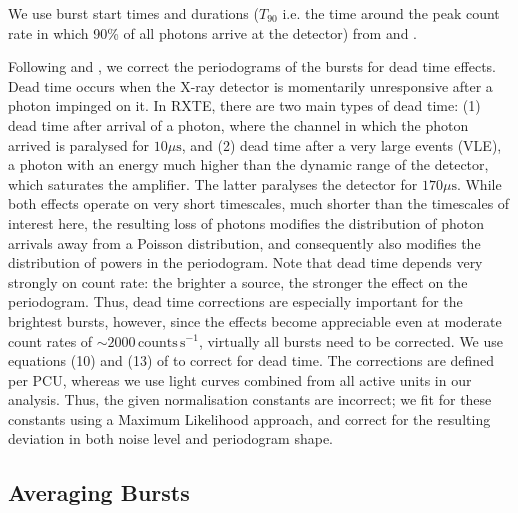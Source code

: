 \documentclass[numberedappendix]{emulateapj}
\begin{document}
We use burst start times and durations ($T_{90}$ i.e. the time around the peak count rate in which 90\% of all photons arrive at the detector) from \citet{gogus1999} and \citet{gogus2000}. 

Following \citet{zhang1995} and \citet{jahoda2006}, we correct the periodograms of the bursts for dead time effects. Dead time occurs when the X-ray detector is momentarily unresponsive after a photon impinged on it. In RXTE, there are two main types of dead time: (1) dead time after arrival of a photon, where the channel in which the photon arrived is paralysed for $10\mu\mathrm{s}$, and (2) dead time after a very large events (VLE), a photon with an energy much higher than the dynamic range of the detector, which saturates the amplifier. The latter paralyses the detector for $170\mu\mathrm{s}$. While both effects operate on very short timescales, much shorter than the timescales of interest here, the resulting loss of photons modifies the distribution of photon arrivals away from a Poisson distribution, and consequently also modifies the distribution of powers in the periodogram. Note that dead time depends very strongly on count rate: the brighter a source, the stronger the effect on the periodogram. Thus, dead time corrections are especially important for the brightest bursts, however, since the effects become appreciable even at moderate count rates of $\sim 2000 \,\mathrm{counts}\,\mathrm{s}^{-1}$, virtually all bursts need to be corrected. We use equations (10) and (13) of \citet{jahoda2006} to correct for dead time. The corrections are defined per PCU, whereas we use light curves combined from all active units in our analysis. Thus, the given normalisation constants are incorrect; we fit for these constants using a Maximum Likelihood approach, and correct for the resulting deviation in both noise level and periodogram shape. 

\subsection{Averaging Bursts}
\end{document}
